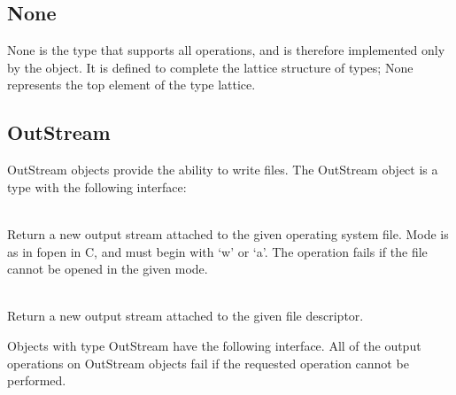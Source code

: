 \subsection{None}
\label{builtin None}
None is the type that supports all operations, and is therefore
implemented only by the  object.  It is defined to complete the
lattice structure of \emd{} types; None represents the top element of the
type lattice.

\subsection{OutStream}
\label{builtin outstream}
OutStream objects provide the ability to write files.  The OutStream object
is a type with the following interface:

\begin{desc}
  \item[\kw{operation} toUnix\/\LB{}fn \CO{} \tn{String}, mode \CO{} \tn{String}\/\RB{} \returns{} \/\LB{}OutStream\/\RB{}]~\\
    Return a new output stream attached to the given operating system file.
    Mode is as in fopen in C, and must begin with `w' or `a'.
    The operation fails if the file cannot be opened in the given mode.
  \item[\kw{operation} create\/\LB{}file \CO{} \tn{Integer}\/\RB{} \returns{} \/\LB{}OutStream\/\RB{}]~\\
    Return a new output stream attached to the given file descriptor.
\end{desc}

\noindent Objects with type OutStream have the following interface.
All of the output operations on OutStream objects fail if the requested
operation cannot be performed.

